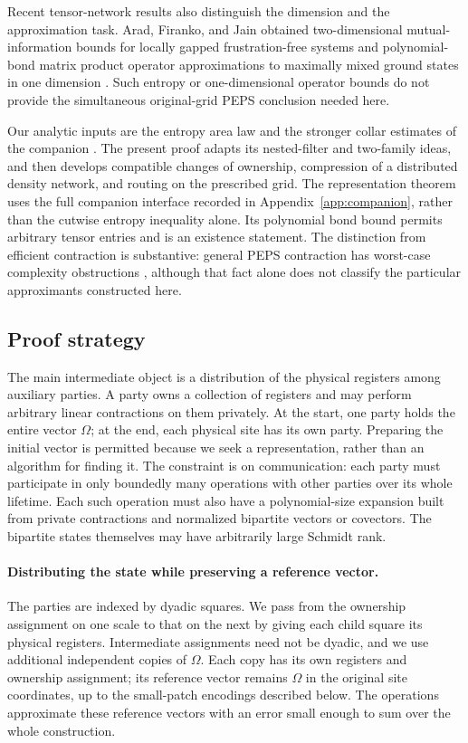 \documentclass[11pt]{article}
\numberwithin{equation}{section}
\theoremstyle{definition}
\theoremstyle{remark}
\begin{document}
Recent tensor-network results also distinguish the dimension and the
approximation task. Arad, Firanko, and Jain obtained two-dimensional
mutual-information bounds for locally gapped frustration-free systems and
polynomial-bond matrix product operator approximations to maximally mixed
ground states in one dimension
\cite[Corollaries~2.7 and~2.9]{AradFirankoJain2026}. Such entropy or
one-dimensional operator bounds do not provide the simultaneous
original-grid PEPS conclusion needed here.

Our analytic inputs are the entropy area law and the stronger collar
estimates of the companion \cite{RepoAreaLaw}. The present proof adapts its
nested-filter and two-family ideas, and then develops compatible changes
of ownership, compression of a distributed density network, and routing on
the prescribed grid. The representation theorem uses the full companion
interface recorded in Appendix~\ref{app:companion}, rather than the
cutwise entropy inequality alone. Its polynomial bond bound permits
arbitrary tensor entries and is an existence statement. The distinction
from efficient contraction is substantive: general PEPS contraction has
worst-case complexity obstructions
\cite{SchuchWolfVerstraeteCirac2007Complexity}, although that fact alone does
not classify the particular approximants constructed here.


\subsection{Proof strategy}

The main intermediate object is a distribution of the physical registers
among auxiliary parties. A party owns a collection of registers and may
perform arbitrary linear contractions on them privately. At the start,
one party holds the entire vector $\Omega$; at the end, each physical
site has its own party. Preparing the initial vector is permitted because
we seek a representation, rather than an algorithm for finding it.
The constraint is on communication: each party must participate in only
boundedly many operations with other parties over its whole lifetime.
Each such operation must also have a polynomial-size expansion built from
private contractions and normalized bipartite vectors or covectors. The
bipartite states themselves may have arbitrarily large Schmidt rank.

\paragraph{Distributing the state while preserving a reference vector.}
The parties are indexed by dyadic squares. We pass from the ownership
assignment on one scale to that on the next by giving each child square
its physical registers. Intermediate assignments need not be dyadic, and
we use additional independent copies of $\Omega$. Each copy has its own
registers and ownership assignment; its reference vector remains $\Omega$
in the original site coordinates, up to the small-patch encodings described
below. The operations approximate these reference vectors with an error
small enough to sum over the whole construction.
\end{document}
